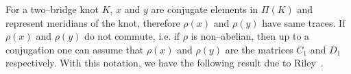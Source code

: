 \documentclass[a4paper]{amsart}
\theoremstyle{plain}
\newtheorem{proposition}[theorem]{Proposition}%
\newtheorem{claim}[theorem]{Claim}
\theoremstyle{definition}
\theoremstyle{remark}
\newcommand{\C}{{\mathbb C}}
\newcommand{\CC}{{\mathbb C}}
\newcommand{\SL}{{\mathrm{SL}_2(\C)}}
\begin{document}

For a two--bridge knot $K$, 
$x$ and $y$ are conjugate elements in $\Pi(K)$ and represent meridians of the knot,
 therefore $\rho(x)$ and $\rho(y)$ have same traces. 
If $\rho(x)$ and $\rho(y)$ do not commute, i.e. if $\rho$ is non--abelian, 
then up to a conjugation 
one can assume that $\rho(x)$ and $\rho(y)$ are the matrices $C_1$ and $D_1$ 
respectively. With this notation, we have the following result due to Riley~\cite{Riley}.



\end{document}

